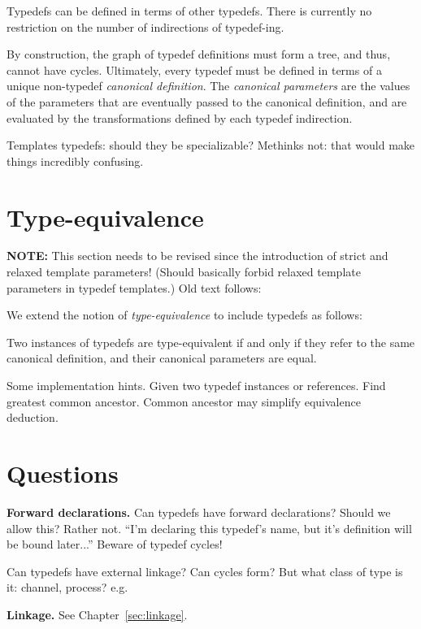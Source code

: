 Typedefs can be defined in terms of other typedefs.  
There is currently no restriction on the number of indirections
of typedef-ing.  

By construction, the graph of typedef definitions must form a tree,
and thus, cannot have cycles.  
Ultimately, every typedef must be defined in terms of a 
unique non-typedef \emph{canonical definition}.  
The \emph{canonical parameters} are the values of the 
parameters that are eventually passed to the canonical definition, 
and are evaluated by the transformations defined by each typedef indirection.  

Templates typedefs: should they be specializable?  
Methinks not: that would make things incredibly confusing.  


\section{Type-equivalence}
\label{sec:typedefs:equivalence}


\textbf{NOTE:} This section needs to be revised
since the introduction of strict and relaxed template parameters!  
(Should basically forbid relaxed template parameters in typedef templates.)
Old text follows:

We extend the notion of \emph{type-equivalence} to include typedefs as follows:

Two instances of typedefs are type-equivalent if and only if
they refer to the same canonical definition, and their canonical 
parameters are equal.  

Some implementation hints.
Given two typedef instances or references.  
Find greatest common ancestor.  
Common ancestor may simplify equivalence deduction.  


\section{Questions}
\label{sec:typedefs:questions}

\textbf{Forward declarations.}
Can typedefs have forward declarations?  Should we allow this?  Rather not.
``I'm declaring this typedef's name, but it's definition will be bound
later...''
Beware of typedef cycles!

Can typedefs have external linkage?  Can cycles form?
But what class of type is it: channel, process?
e.g. 



\medskip
\textbf{Linkage.}  See Chapter~\ref{sec:linkage}.  


